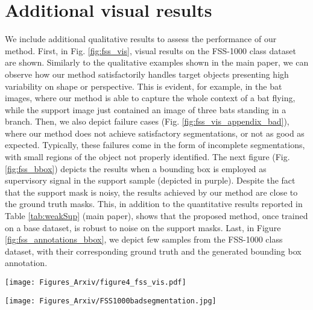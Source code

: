 \documentclass[runningheads]{llncs}
\begin{document}
\section{Additional visual results}

We include additional qualitative results to assess the performance of our method. First, in Fig. \ref{fig:fss_vis}, visual results on the FSS-1000 class dataset are shown. Similarly to the qualitative examples shown in the main paper, we can observe how our method satisfactorily handles target objects presenting high variability on shape or perspective. This is evident, for example, in the bat images, where our method is able to capture the whole context of a bat flying, while the support image just contained an image of three bats standing in a branch. Then, we also depict failure cases (Fig. \ref{fig:fss_vis_appendix_bad}), where our method does not achieve satisfactory segmentations, or not as good as expected. Typically, these failures come in the form of incomplete segmentations, with small regions of the object not properly identified. The next figure (Fig. \ref{fig:fss_bbox}) depicts the results when a bounding box is employed as supervisory signal in the support sample (depicted in purple). Despite the fact that the support mask is noisy, the results achieved by our method are close to the ground truth masks. This, in addition to the quantitative results reported in Table \ref{tab:weakSup} (main paper), shows that the proposed method, once trained on a base dataset, is robust to noise on the support masks. Last, in Figure \ref{fig:fss_annotations_bbox}, we depict few samples from the FSS-1000 class dataset, with their corresponding ground truth and the generated bounding box annotation.



\setcounter{page}{1}
\setcounter{figure}{0}



\begin{figure*}[h!]
\centering
\texttt{[image: Figures\_Arxiv/figure4\_fss\_vis.pdf]}
\caption{Visual results on FSS-1000 class dataset in 1-way 1-shot setting using the proposed method. The support set, as well as predictions on several query images with corresponding ground truths are shown.}
\label{fig:fss_vis}
\end{figure*}



\begin{figure*}[h!]
\centering
\texttt{[image: Figures\_Arxiv/FSS1000badsegmentation.jpg]}
\caption{Visual examples of \textit{bad} segmentation results on the FSS-1000 class dataset in 1-way 1-shot setting using the proposed method. The support set, as well as predictions on several query images with corresponding ground truths are shown.}
\label{fig:fss_vis_appendix_bad}
\end{figure*}
\end{document}
